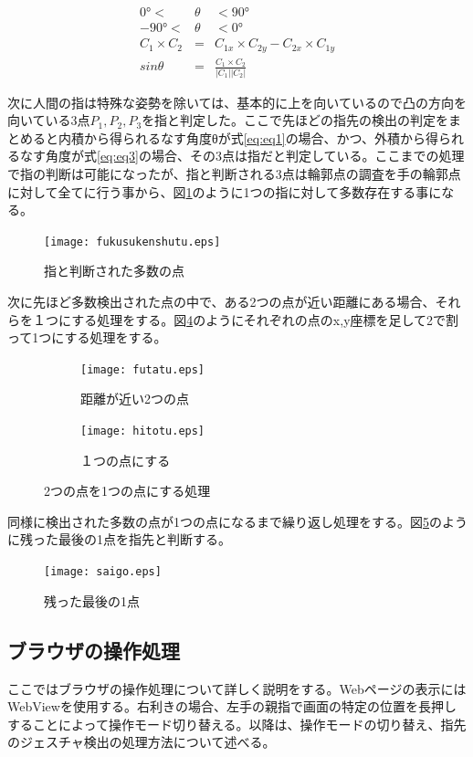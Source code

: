 \documentclass[11pt,a4j, titlepage]{jarticle} %
\begin{document}
\begin{eqnarray}
0°<&θ&<90° \label{eq:eq3} \\
-90°<&θ&<0° \label{eq:eq4} \\
C_1×C_2&=&C_{1x}×C_{2y}-C_{2x}×C_{1y} \\
sin{θ}&=&\frac{C_1×C_2}{|C_1||C_2|} \label{eq:eq5}
\end{eqnarray}

次に人間の指は特殊な姿勢を除いては、基本的に上を向いているので凸の方向を向いている3点$P_1, P_2, P_3$を指と判定した。ここで先ほどの指先の検出の判定をまとめると内積から得られるなす角度θが式\ref{eq:eq1}の場合、かつ、外積から得られるなす角度が式\ref{eq:eq3}の場合、その3点は指だと判定している。ここまでの処理で指の判断は可能になったが、指と判断される3点は輪郭点の調査を手の輪郭点に対して全てに行う事から、図\ref{fig:f18}のように1つの指に対して多数存在する事になる。

\begin{figure}[H]
	\centering
	\texttt{[image: fukusukenshutu.eps]}
	\caption{指と判断された多数の点}
	\label{fig:f18}
\end{figure}

次に先ほど多数検出された点の中で、ある2つの点が近い距離にある場合、それらを１つにする処理をする。図\ref{fig:f19}のようにそれぞれの点のx,y座標を足して2で割って1つにする処理をする。

\begin{figure}[H]
	\centering
	\begin{subfigure}{0.4\columnwidth}
		\centering
		\texttt{[image: futatu.eps]}
		\caption{距離が近い2つの点}
		\label{fig:futatu}
	\end{subfigure}
	\begin{subfigure}{0.4\columnwidth}
		\centering
		\texttt{[image: hitotu.eps]}
		\caption{１つの点にする}
		\label{fig:hitotu}
	\end{subfigure}
	\caption{2つの点を1つの点にする処理}
	\label{fig:f19}
\end{figure}

同様に検出された多数の点が1つの点になるまで繰り返し処理をする。図\ref{fig:f20}のように残った最後の1点を指先と判断する。

\begin{figure}[H]
	\centering
	\texttt{[image: saigo.eps]}
	\caption{残った最後の1点}
	\label{fig:f20}
\end{figure}

\subsection{ブラウザの操作処理}
ここではブラウザの操作処理について詳しく説明をする。Webページの表示にはWebViewを使用する。右利きの場合、左手の親指で画面の特定の位置を長押しすることによって操作モード切り替える。以降は、操作モードの切り替え、指先のジェスチャ検出の処理方法について述べる。
\end{document}
